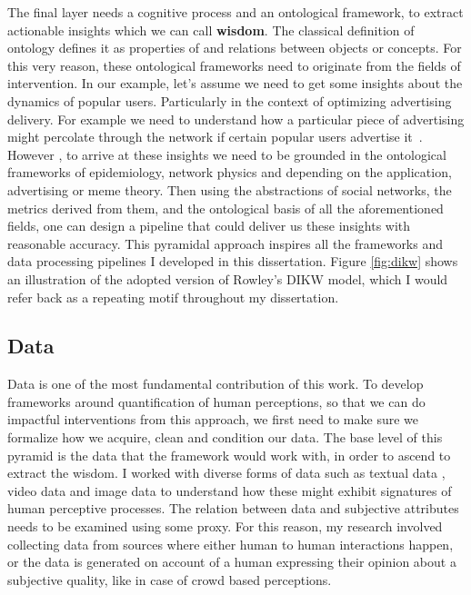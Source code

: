 The final layer needs a cognitive process and an ontological framework, to extract actionable insights which we can call \textbf{wisdom}. The classical definition of ontology defines it as properties of and relations between objects or concepts. For this very reason, these ontological frameworks need to originate from the fields of intervention.  In our example, let's assume we need to get some insights about the dynamics of popular users. Particularly in the context of optimizing advertising delivery. For example we need to understand how a particular piece of advertising might percolate through the network if certain popular users advertise it~\cite{li2012diffusion}. However , to arrive at these insights we need to be grounded in the ontological frameworks of epidemiology, network physics and depending on the application, advertising or meme theory. Then using the abstractions of social networks, the metrics derived from them, and the ontological basis of all the aforementioned fields, one can design a pipeline that could deliver us these insights with reasonable accuracy. This pyramidal approach inspires all the frameworks and data processing pipelines I developed in this dissertation. Figure \ref{fig:dikw} shows an illustration of the adopted version of Rowley's DIKW model, which I would refer back as a repeating motif throughout my dissertation.

\subsection{Data}
Data is one of the most fundamental contribution of this work. To develop frameworks around quantification of human perceptions, so that we can do impactful interventions from this approach, we first need to make sure we formalize how we acquire, clean and condition our data. The base level of this pyramid is the data that the framework would work with, in order to ascend to extract the wisdom. I worked with diverse forms of data such as textual data , video data and image data to understand how these might exhibit signatures of human perceptive processes. The relation between data and subjective attributes needs to be examined using some proxy. For this reason, my research involved collecting data from sources where either human to human interactions happen, or the data is generated on account of a human expressing their opinion about a subjective quality, like in case of crowd based perceptions.

